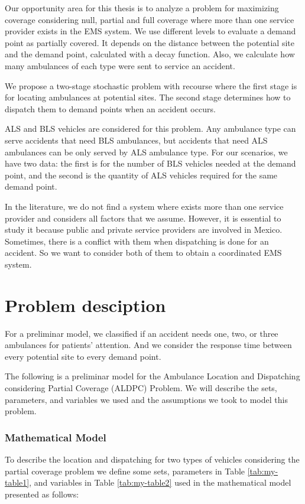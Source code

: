 Our opportunity area for this thesis is to analyze a problem for maximizing coverage considering null, partial and full coverage where more than one service provider exists in the EMS system. We use different levels to evaluate a demand point as partially covered. It depends on the distance between the potential site and the demand point, calculated with a decay function. Also, we calculate how many ambulances of each type were sent to service an accident. 

We propose a two-stage stochastic problem with recourse where the first stage is for locating ambulances at potential sites. The second stage determines how to dispatch them to demand points when an accident occurs. 

ALS and BLS vehicles are considered for this problem. Any ambulance type can serve accidents that need BLS ambulances, but accidents that need ALS ambulances can be only served by ALS ambulance type. For our scenarios, we have two data: the first is for the number of BLS vehicles needed at the demand point, and the second is the quantity of ALS vehicles required for the same demand point.

In the literature, we do not find a system where exists more than one service provider and considers all factors that we assume. However, it is essential to study it because public and private service providers are involved in Mexico. Sometimes, there is a conflict with them when dispatching is done for an accident. So we want to consider both of them to obtain a coordinated EMS system. 

\chapter{Problem desciption}\label{cap:problem}
For a preliminar model, we classified if an accident needs one, two, or three ambulances for patients' attention. And we consider the response time between every potential site to every demand point.

The following is a preliminar model for the Ambulance Location and Dispatching considering Partial Coverage (ALDPC) Problem. We will describe the sets, parameters, and variables we used and the assumptions we took to model this problem.

\subsection{Mathematical Model}

To describe the location and dispatching for two types of vehicles considering the partial coverage problem we define some sets, parameters in Table \ref{tab:my-table1},  and variables in Table \ref{tab:my-table2} used in the mathematical model presented as follows: 


